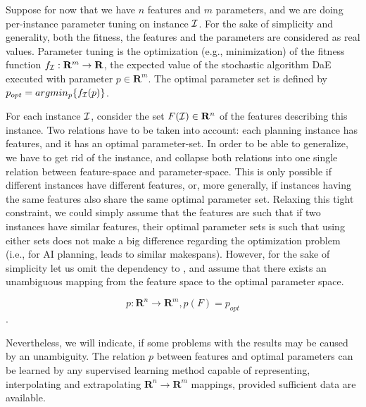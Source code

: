 \documentclass{MYsig-alternate}
\begin{document}
Suppose for now that we have $n$ features and $m$ parameters, and we are doing per-instance parameter tuning on instance $\cal I$. For the sake of simplicity and generality, both the fitness, the features and the parameters are considered as real values. Parameter tuning is the optimization (e.g., minimization) of the fitness function \begin{math}f_{\cal I}:\mathbf{R}^m\to \mathbf{R} \end{math}, the expected value of the stochastic algorithm DaE executed with parameter \begin{math} p \in \mathbf{R}^m \end{math}. The optimal parameter set is defined by \begin{math} p_{opt}=argmin_p\{f_{\cal I}(p)\} \end{math}. 

For each instance $\cal I$, consider the set \begin{math} F({\cal I}) \in \mathbf{R}^n \end{math} of the features describing this instance. 
Two relations have to be taken into account: each planning instance has features, and it has an optimal parameter-set. In order to be able to generalize, we have to get rid of the instance, and collapse both relations into one single relation between feature-space and parameter-space. This is only possible if different instances have different features, or, more generally, if instances having the same features also share the same optimal parameter set. Relaxing this tight constraint, we could simply assume that the features are such that if two instances have similar features, their optimal parameter sets is such that using either sets does not make a big difference regarding the optimization problem (i.e., for AI planning, leads to similar makespans). However, for the sake of simplicity let us omit the dependency to , and assume that there exists an unambiguous mapping from the feature space to the optimal parameter space. 

\begin{equation} p: \mathbf{R}^n \to \mathbf{R}^m, p(F)=p_{opt} \end{equation}.	

Nevertheless, we will indicate, if some problems with the results may be caused by an unambiguity. The relation \begin{math} p \end{math} between features and optimal parameters can be learned by any supervised learning method capable of representing, interpolating and extrapolating  \begin{math}\mathbf{R}^n\to \mathbf{R}^m \end{math} mappings, provided sufficient data are available.
\end{document}
